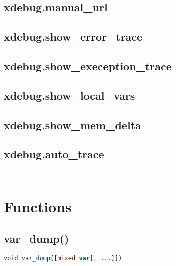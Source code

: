 \subsection{xdebug.manual\_url}



\subsection{xdebug.show\_error\_trace}


\subsection{xdebug.show\_exeception\_trace}



\subsection{xdebug.show\_local\_vars}


\subsection{xdebug.show\_mem\_delta}


\subsection{xdebug.auto\_trace}



\begin{lstlisting}[language=PHP]

\end{lstlisting}




\begin{lstlisting}[language=PHP]

\end{lstlisting}


\section{Functions}


\subsection{var\_dump()}


\begin{lstlisting}[language=PHP]
void var_dump([mixed var[, ...]])
\end{lstlisting}

